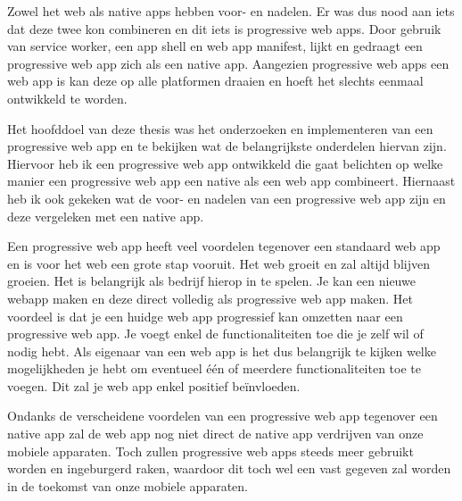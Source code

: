 Zowel het web als native apps hebben voor- en nadelen. Er was dus nood aan iets dat deze twee kon combineren en dit iets is progressive web apps. Door gebruik van service worker, een app shell en web app manifest, lijkt en gedraagt een progressive web app zich als een native app. Aangezien progressive web apps een web app is kan deze op alle platformen draaien en hoeft het slechts eenmaal ontwikkeld te worden. 

Het hoofddoel van deze thesis was het onderzoeken en implementeren van een progressive web app en te bekijken wat de belangrijkste onderdelen hiervan zijn. Hiervoor heb ik een progressive web app ontwikkeld die gaat belichten op welke manier een progressive web app een native als een web app combineert. Hiernaast heb ik ook gekeken wat de voor- en nadelen van een progressive web app zijn en deze vergeleken met een native app.

Een progressive web app heeft veel voordelen tegenover een standaard web app en is voor het web een grote stap vooruit. Het web groeit en zal altijd blijven groeien. Het is belangrijk als bedrijf hierop in te spelen. Je kan een nieuwe webapp maken en deze direct volledig als progressive web app maken. Het voordeel is dat je een huidge web app progressief kan omzetten naar een progressive web app. Je voegt enkel de functionaliteiten toe die je zelf wil of nodig hebt. Als eigenaar van een web app is het dus belangrijk te kijken welke mogelijkheden je hebt om eventueel één of meerdere functionaliteiten toe te voegen. Dit zal je web app enkel positief beïnvloeden. 

Ondanks de verscheidene voordelen van een progressive web app tegenover een native app zal de web app nog niet direct de native app verdrijven van onze mobiele apparaten. Toch zullen progressive web apps steeds meer gebruikt worden en ingeburgerd raken, waardoor dit toch wel een vast gegeven zal worden in de toekomst van onze mobiele apparaten.





